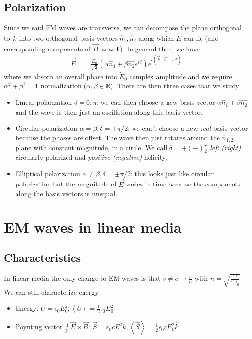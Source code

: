\documentclass[10pt,twocolumn]{article}
\newcommand{\expvalue}[1]{\left<#1\right>}
\begin{document}
\subsection{Polarization}

Since we said EM waves are transverse, we can decompose the plane orthogonal to $\vec{k}$ into two orthogonal basis vectors $\hat{n}_1, \hat{n}_2$ along which $\vec{E}$ can lie (and corresponding components of $\vec{B}$ as well). In general then, we have
\begin{align}
    \vec{E} &= \frac{\tilde{E_0}}{\sqrt{2}}\left( \alpha\hat{n}_1 + \beta\hat{n_2}e^{i\delta} \right)e^{i(\vec{k} \cdot \vec{r} - \omega t)}
\end{align}
where we absorb an overall phase into $\tilde{E}_0$ complex amplitude and we require $\alpha^2 + \beta^2 = 1$ normalization ($\alpha, \beta \in \mathbb{R}$). There are then three cases that we study
\begin{itemize}
    \item Linear polarization $\delta = 0, \pi$: we can then choose a new basis vector $\alpha \hat{n}_1 \pm \beta \hat{n_2}$ and the wave is then just an oscillation along this basis vector.
    \item Circular polarization $\alpha = \beta, \delta = \pm \pi/2$: we can't choose a new \emph{real} basis vector because the phases are offset. The wave then just rotates around the $\hat{n}_{1,2}$ plane with constant magnitude, in a circle. We call $\delta = +(-)\frac{\pi}{2}$ \emph{left (right)} circularly polarized and \emph{positive (negative)} helicity.
    \item Elliptical polarization $\alpha \neq \beta, \delta = \pm \pi/2$: this looks just like circular polarization but the magnitude of $\vec{E}$ varies in time because the components along the basis vectors is unequal. 
\end{itemize}

\section{EM waves in linear media}

\subsection{Characteristics}

In linear media the only change to EM waves is that $v \neq c \to \frac{c}{n}$ with $n = \sqrt{\frac{\epsilon \mu}{\epsilon_0 \mu_0}}$ We can still characterize energy
\begin{itemize}
    \item Energy: $U = \epsilon_0 E_0^2, \expvalue{U} = \frac{1}{2}\epsilon_0 E_0^2$
    \item Poynting vector $\frac{1}{\mu_0}\vec{E} \times \vec{B}$: $\vec{S} = \epsilon_0cE^2\hat{k}, \expvalue{\vec{S}} = \frac{1}{2}\epsilon_0 cE_0^2\hat{k}$
\end{itemize}
\end{document}

